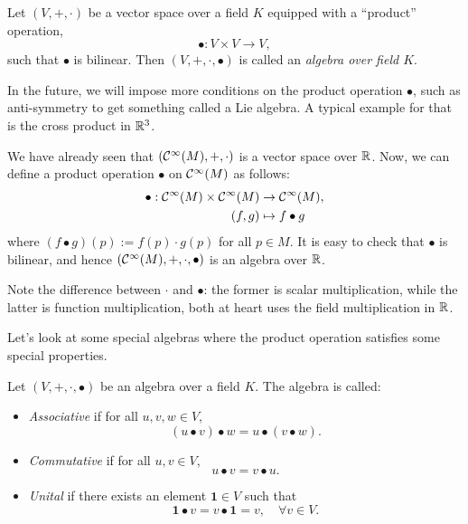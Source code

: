 \begin{definition}
    Let \((V, +, \cdot)\) be a vector space over a field \(K\) equipped with a ``product'' operation,
    \begin{equation}
        \bullet: V \times V \to V,
    \end{equation}
    such that \(\bullet\) is bilinear. Then \((V, +, \cdot, \bullet)\) is called an \emph{algebra over field \(K\)}.
\end{definition}
In the future, we will impose more conditions on the product operation \(\bullet\), such as anti-symmetry to get something called a Lie algebra. A typical example for that is the cross product in \(\mathbb R^3\).
\begin{example}
    We have already seen that \(\qty(\mathcal C^\infty(M), +, \cdot)\) is a vector space over \(\mathbb R\). Now, we can define a product operation \(\bullet\) on \(\mathcal C^\infty(M)\) as follows:
    \begin{equation}
        \begin{aligned}
            \bullet: \mathcal C^\infty(M) \times \mathcal C^\infty(M) & \to \mathcal C^\infty(M),  \\
            (f, g)                                      & \mapsto f \bullet g
        \end{aligned}
    \end{equation}
    where \((f \bullet g)(p) := f(p) \cdot g(p)\) for all \(p \in M\). It is easy to check that \(\bullet\) is bilinear, and hence \(\qty(\mathcal C^\infty(M), +, \cdot, \bullet)\) is an algebra over \(\mathbb R\).

    Note the difference between \(\cdot\) and \(\bullet\): the former is scalar multiplication, while the latter is function multiplication, both at heart uses the field multiplication in \(\mathbb R\).
\end{example}
Let's look at some special algebras where the product operation satisfies some special properties.
\begin{definition}
    Let \((V, +, \cdot, \bullet)\) be an algebra over a field \(K\). The algebra is called:
    \begin{itemize}
        \item \emph{Associative} if for all \(u, v, w \in V\),
              \begin{equation}
                  (u \bullet v) \bullet w = u \bullet (v \bullet w).
              \end{equation}
        \item \emph{Commutative} if for all \(u, v \in V\),
              \begin{equation}
                  u \bullet v = v \bullet u.
              \end{equation}
        \item \emph{Unital} if there exists an element \(\mathbf{1} \in V\) such that
              \begin{equation}
                  \mathbf{1} \bullet v = v \bullet \mathbf{1} = v, \quad \forall v \in V.
              \end{equation}
    \end{itemize}
\end{definition}
